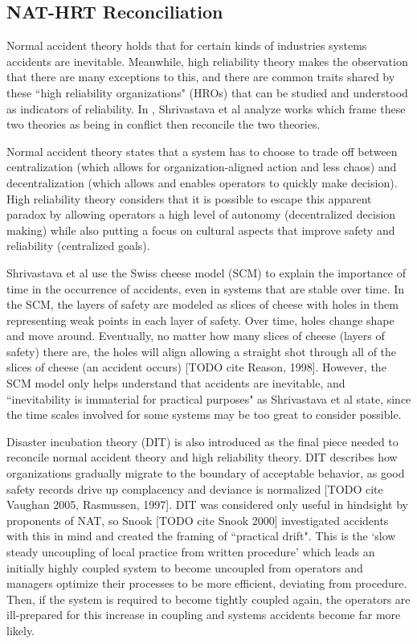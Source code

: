 \documentclass[11pt]{article}
\begin{document}
\subsection{NAT-HRT Reconciliation}

Normal accident theory holds that for certain kinds of industries systems accidents are inevitable.
Meanwhile, high reliability theory makes the observation that there are many exceptions to this, and
there are common traits shared by these ``high reliability organizations" (HROs) that can be studied
and understood as indicators of reliability. In \cite{shrivastava2009normal}, Shrivastava et al
analyze works which frame these two theories as being in conflict then reconcile the two theories.

Normal accident theory states that a system has to choose to trade off between centralization (which
allows for organization-aligned action and less chaos) and decentralization (which allows and
enables operators to quickly make decision). High reliability theory considers that it is possible
to escape this apparent paradox by allowing operators a high level of autonomy (decentralized
decision making) while also putting a focus on cultural aspects that improve safety and reliability
(centralized goals).

Shrivastava et al use the Swiss cheese model (SCM) to explain the importance of time in the
occurrence of accidents, even in systems that are stable over time. In the SCM, the layers of safety
are modeled as slices of cheese with holes in them representing weak points in each layer of safety.
Over time, holes change shape and move around. Eventually, no matter how many slices of cheese
(layers of safety) there are, the holes will align allowing a straight shot through all of the
slices of cheese (an accident occurs) [TODO cite Reason, 1998]. However, the SCM model only helps
understand that accidents are inevitable, and ``inevitability is immaterial for practical purposes"
as Shrivastava et al state, since the time scales involved for some systems may be too great to
consider possible.

Disaster incubation theory (DIT) is also introduced as the final piece needed to reconcile normal
accident theory and high reliability theory. DIT describes how organizations gradually migrate to
the boundary of acceptable behavior, as good safety records drive up complacency and deviance is
normalized [TODO cite Vaughan 2005, Rasmussen, 1997]. DIT was considered only useful in hindsight by
proponents of NAT, so Snook [TODO cite Snook 2000] investigated accidents with this in mind and
created the framing of ``practical drift". This is the `slow steady uncoupling of local practice
from written procedure' which leads an initially highly coupled system to become uncoupled from
operators and managers optimize their processes to be more efficient, deviating from procedure.
Then, if the system is required to become tightly coupled again, the operators are ill-prepared for
this increase in coupling and systems accidents become far more likely.
\end{document}

